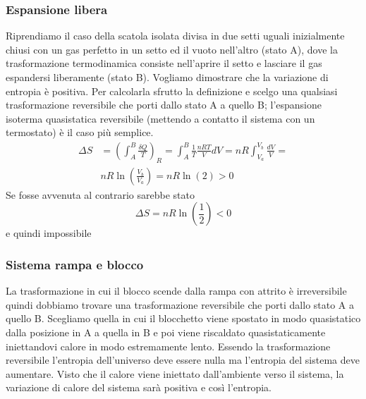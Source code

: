 \documentclass[
10pt, %
a4paper, %
oneside, %
headinclude,footinclude, %
BCOR5mm, %
]{scrartcl}
\begin{document}
\subsubsection*{Espansione libera}
Riprendiamo il caso della scatola isolata divisa in due setti uguali inizialmente chiusi con un gas perfetto in un setto ed il vuoto nell'altro (stato A), dove la trasformazione termodinamica consiste nell'aprire il setto e lasciare il gas espandersi liberamente (stato B). Vogliamo dimostrare che la variazione di entropia è positiva. Per calcolarla sfrutto la definizione e scelgo una qualsiasi trasformazione reversibile che porti dallo stato A a quello B; l'espansione isoterma quasistatica reversibile (mettendo a contatto il sistema con un termostato) è il caso più semplice.
\begin{align*}
	\Delta S &= \left(\int_{A}^{B}\frac{\delta Q}{T}\right)_R = \int_{A}^{B}\frac{1}{T}\frac{nRT}{V}dV =nR\int_{V_a}^{V_b}\frac{dV}{V} =\\
	&nR\ln\left(\frac{V_b}{V_a}\right)= nR\ln(2)>0
\end{align*}
Se fosse avvenuta al contrario sarebbe stato
\[\Delta S = nR\ln(\frac{1}{2})<0\]
e quindi impossibile
\subsubsection*{Sistema rampa e blocco}
La trasformazione in cui il blocco scende dalla rampa con attrito è irreversibile quindi dobbiamo trovare una trasformazione reversibile che porti dallo stato A a quello B. Scegliamo quella in cui il blocchetto viene spostato in modo quasistatico dalla posizione in A a quella in B e poi viene riscaldato quasistaticamente iniettandovi calore in modo estremamente lento. Essendo la trasformazione reversibile l'entropia dell'universo deve essere nulla ma l'entropia del sistema deve aumentare. Visto che il calore viene iniettato dall'ambiente verso il sistema, la variazione di calore del sistema sarà positiva e così l'entropia. 
\end{document}
